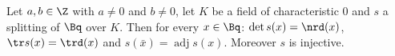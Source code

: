 Let $a,b\in\Z$ with $a\ne0$ and $b\ne0$, let $K$ be a field of characteristic $0$ and $s$ a splitting of $\Bq$ over $K$. Then for every $x\in\Bq$:
$\det s(x)=\nrd(x)$, $\tr s(x)=\trd(x)$ and $s(\bar x)=\operatorname{adj}s(x)$. Moreover $s$ is injective.
